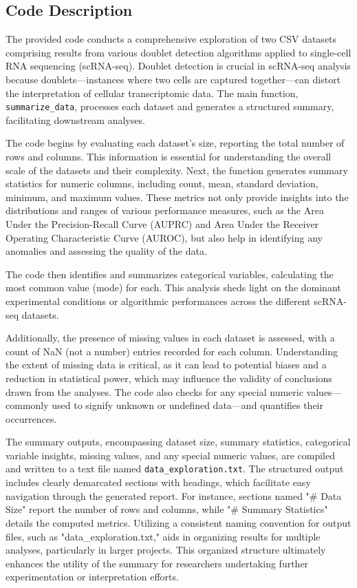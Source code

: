 \documentclass[11pt]{article}
\begin{document}
\subsection{Code Description}

The provided code conducts a comprehensive exploration of two CSV datasets comprising results from various doublet detection algorithms applied to single-cell RNA sequencing (scRNA-seq). Doublet detection is crucial in scRNA-seq analysis because doublets—instances where two cells are captured together—can distort the interpretation of cellular transcriptomic data. The main function, \texttt{summarize\_data}, processes each dataset and generates a structured summary, facilitating downstream analyses.

The code begins by evaluating each dataset's size, reporting the total number of rows and columns. This information is essential for understanding the overall scale of the datasets and their complexity. Next, the function generates summary statistics for numeric columns, including count, mean, standard deviation, minimum, and maximum values. These metrics not only provide insights into the distributions and ranges of various performance measures, such as the Area Under the Precision-Recall Curve (AUPRC) and Area Under the Receiver Operating Characteristic Curve (AUROC), but also help in identifying any anomalies and assessing the quality of the data.

The code then identifies and summarizes categorical variables, calculating the most common value (mode) for each. This analysis sheds light on the dominant experimental conditions or algorithmic performances across the different scRNA-seq datasets.

Additionally, the presence of missing values in each dataset is assessed, with a count of NaN (not a number) entries recorded for each column. Understanding the extent of missing data is critical, as it can lead to potential biases and a reduction in statistical power, which may influence the validity of conclusions drawn from the analyses. The code also checks for any special numeric values—commonly used to signify unknown or undefined data—and quantifies their occurrences.

The summary outputs, encompassing dataset size, summary statistics, categorical variable insights, missing values, and any special numeric values, are compiled and written to a text file named \texttt{data\_exploration.txt}. The structured output includes clearly demarcated sections with headings, which facilitate easy navigation through the generated report. For instance, sections named "\# Data Size" report the number of rows and columns, while "\# Summary Statistics" details the computed metrics. Utilizing a consistent naming convention for output files, such as "data\_exploration.txt," aids in organizing results for multiple analyses, particularly in larger projects. This organized structure ultimately enhances the utility of the summary for researchers undertaking further experimentation or interpretation efforts.
\end{document}
